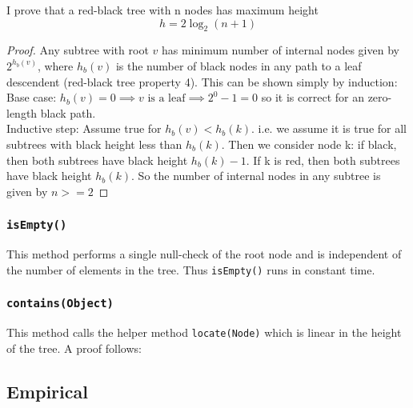 I prove that a red-black tree with n nodes has maximum height
\begin{equation*}
h = 2 \log_2(n + 1)
\end{equation*}

\begin{proof}
    Any subtree with root $v$ has minimum number of internal nodes given by $2^{h_b (v)}$, where $h_b (v)$ is the number of black nodes in any path to a leaf descendent (red-black tree property 4). This can be shown simply by induction: \\
    Base case: $h_b (v) = 0 \implies v \text{ is a leaf} \implies 2^0 - 1 = 0$ so it is correct for an zero-length black path. \\
    Inductive step: Assume true for $h_b (v) < h_b(k)$. i.e. we assume it is true for all subtrees with black height less than $h_b(k)$. Then we consider node k: if black, then both subtrees have black height $h_b(k) - 1$. If k is red, then both subtrees have black height $h_b(k)$. So the number of internal nodes in any subtree is given by $n >= 2 $
\end{proof}

\subsubsection{\texttt{isEmpty()}}
This method performs a single null-check of the root node and is independent of the number of elements in the tree. Thus \texttt{isEmpty()} runs in constant time.

\subsubsection{\texttt{contains(Object)}}
This method calls the helper method \texttt{locate(Node)} which is linear in the height of the tree. A proof follows: \\


\subsection{Empirical}
